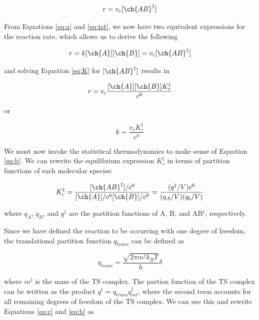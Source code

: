 \begin{equation}
  r = v_c [\ch{AB}^\ddagger]
\end{equation}

From Equations \ref{eq:a} and \ref{eq:tst}, we now have two equivalent
expressions for the reaction rate, which allows us to derive the following

\begin{equation}
  r = k[\ch{A}][\ch{B}] = v_c [\ch{AB}^\ddagger]
\end{equation}

\noindent and solving Equation \ref{eq:K} for $[\ch{AB}^\ddagger]$ results in


\begin{equation}
  r = v_c\frac{[\ch{A}][\ch{B}]K_c^\ddagger}{c^0}
\end{equation}

\noindent or

\begin{equation}
  k = \frac{v_cK_c^\ddagger}{c^0}
\label{eq:b}
\end{equation}

We must now invoke the statistical thermodynamics to make sense of Equation
\ref{eq:b}. We can rewrite the equilibrium expression $K_c^\ddagger$ in terms of
partition functions of each molecular species:

\begin{equation}
    K_c^{\ddagger} = \frac{[\ch{AB}^\ddagger]/c^0}{[\ch{A}]/c^0[\ch{B}]/c^0}
    = \frac{(q^\ddagger/V)c^0}{(q_A/V)(q_b/V)}
\label{eq:c}
\end{equation}

\noindent where $q_A$, $q_B$, and $q^\ddagger$ are the partition functions of A,
B, and AB$^\ddagger$, respectively.

Since we have defined the reaction to be occurring with one degree of freedom,
the translational partition function $q_{trans}$ can be defined as

\begin{equation}
  q_{trans} = \frac{\sqrt{2\pi m^\ddagger k_BT}}{h}\delta
\end{equation}

\noindent where $m^\ddagger$ is the mass of the TS complex. The partion function
of the TS complex can be written as the product $q^\ddagger =
q_{trans}q_{int}^\ddagger$, where the second term accounts for all remaining
degrees of freedom of the TS complex. We can use this and rewrite Equations
\ref{eq:c} and \ref{eq:b} as

